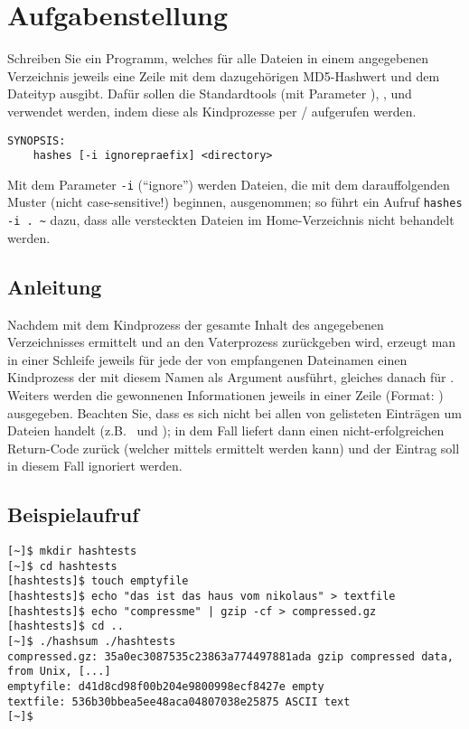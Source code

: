 




\section*{Aufgabenstellung}

Schreiben Sie ein Programm, welches für alle Dateien in einem angegebenen
Verzeichnis jeweils eine Zeile mit dem dazugehörigen MD5-Hashwert und dem
Dateityp ausgibt. Dafür sollen die Standardtools  (mit Parameter
), , und  verwendet werden, indem
diese als Kindprozesse per / aufgerufen
werden.


\begin{verbatim}
SYNOPSIS:
	hashes [-i ignorepraefix] <directory>
\end{verbatim}

Mit dem Parameter \verb_-i_ (“ignore”) werden Dateien, die mit dem
darauffolgenden Muster (nicht case-sensitive!) beginnen, ausgenommen;
so führt ein Aufruf \verb_hashes -i . ~_ dazu, dass alle versteckten
Dateien im Home-Verzeichnis nicht behandelt werden.


\subsection*{Anleitung}
Nachdem mit dem Kindprozess  der gesamte Inhalt des angegebenen
Verzeichnisses ermittelt und an den Vaterprozess zurückgeben wird, erzeugt man
in einer Schleife jeweils für jede der von  empfangenen Dateinamen
einen Kindprozess der  mit diesem Namen als Argument ausführt,
gleiches danach für . Weiters werden die gewonnenen Informationen
jeweils in einer Zeile (Format: )
ausgegeben. Beachten Sie, dass es sich nicht bei allen von 
gelisteten Einträgen um Dateien handelt (z.B.\  und ); in dem Fall liefert dann
 einen nicht-erfolgreichen Return-Code zurück (welcher
mittels  ermittelt werden kann) und der Eintrag soll in
diesem Fall ignoriert werden.

\subsection*{Beispielaufruf}
\begin{verbatim}
[~]$ mkdir hashtests
[~]$ cd hashtests
[hashtests]$ touch emptyfile
[hashtests]$ echo "das ist das haus vom nikolaus" > textfile
[hashtests]$ echo "compressme" | gzip -cf > compressed.gz
[hashtests]$ cd ..
[~]$ ./hashsum ./hashtests
compressed.gz: 35a0ec3087535c23863a774497881ada gzip compressed data, from Unix, [...]
emptyfile: d41d8cd98f00b204e9800998ecf8427e empty
textfile: 536b30bbea5ee48aca04807038e25875 ASCII text
[~]$
\end{verbatim}

\osueguidelinestwo


